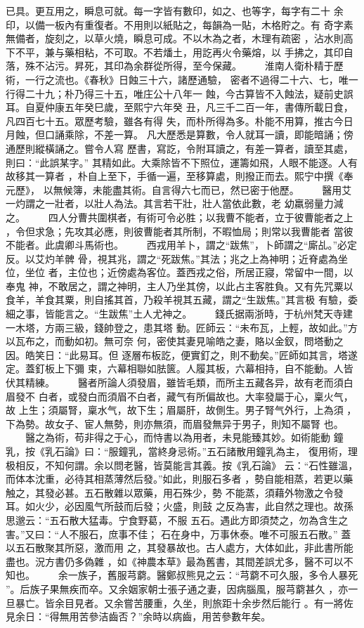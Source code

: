 \documentclass{ctexart}
\begin{document}
已具。更互用之，瞬息可就。每一字皆有數印，如之、也等字，每字有二十 余印，以備一板內有重復者。不用則以紙貼之，每韻為一貼，木格貯之。有 奇字素無備者，旋刻之，以草火燒，瞬息可成。不以木為之者，木理有疏密 ，沾水則高下不平，兼与藥相粘，不可取。不若燔土，用訖再火令藥熔，以 手拂之，其印自落，殊不沾污。昇死，其印為余群從所得，至今保藏。 　　淮南人衛朴精于歷術，一行之流也。《春秋》日蝕三十六，諸歷通驗， 密者不過得二十六、七，唯一行得二十九；朴乃得三十五，唯庄公十八年一 蝕，今古算皆不入蝕法，疑前史誤耳。自夏仲康五年癸巳歲，至熙宁六年癸 丑，凡三千二百一年，書傳所載日食，凡四百七十五。眾歷考驗，雖各有得 失，而朴所得為多。朴能不用算，推古今日月蝕，但口誦乘除，不差一算。 凡大歷悉是算數，令人就耳一讀，即能暗誦；傍通歷則縱橫誦之。嘗令人寫 歷書，寫訖，令附耳讀之，有差一算者，讀至其處，則曰：``此誤某字。'' 其精如此。大乘除皆不下照位，運籌如飛，人眼不能逐。人有故移其一算者 ，朴自上至下，手循一遍，至移算處，則撥正而去。熙宁中撰《奉元歷》， 以無候簿，未能盡其術。自言得六七而已，然已密于他歷。 　　醫用艾一灼謂之一壯者，以壯人為法。其言若干壯，壯人當依此數，老 幼羸弱量力減之。 　　四人分曹共圍棋者，有術可令必胜；以我曹不能者，立于彼曹能者之上 ，令但求急；先攻其必應，則彼曹能者其所制，不暇恤局；則常以我曹能者 當彼不能者。此虞卿斗馬術也。 　　西戎用羊卜，謂之``跋焦''，卜師謂之``廝乩。''必定反。以艾灼羊髀 骨，視其兆，謂之``死跋焦。''其法；兆之上為神明；近脊處為坐位，坐位 者，主位也；近傍處為客位。蓋西戎之俗，所居正寢，常留中一間，以奉鬼 神，不敢居之，謂之神明，主人乃坐其傍，以此占主客胜負。又有先咒粟以 食羊，羊食其粟，則自搖其首，乃殺羊視其五藏，謂之``生跋焦。''其言极 有驗，委細之事，皆能言之。``生跋焦''土人尤神之。 　　錢氏据兩浙時，于杭州梵天寺建一木塔，方兩三級，錢帥登之，患其塔 動。匠師云：``未布瓦，上輕，故如此。''方以瓦布之，而動如初。無可奈 何，密使其妻見喻皓之妻，賂以金釵，問塔動之因。皓笑日：``此易耳。但 逐層布板訖，便實釘之，則不動矣。''匠師如其言，塔遂定。蓋釘板上下彌 束，六幕相聯如胠篋。人履其板，六幕相持，自不能動。人皆伏其精練。 　　醫者所論人須發眉，雖皆毛類，而所主五藏各异，故有老而須白眉發不 白者，或發白而須眉不白者，藏气有所偏故也。大率發屬于心，稟火气，故 上生；須屬腎，稟水气，故下生；眉屬肝，故側生。男子腎气外行，上為須 ，下為勢。故女子、宦人無勢，則亦無須，而眉發無异于男子，則知不屬腎 也。 　　醫之為術，苟非得之于心，而恃書以為用者，未見能臻其妙。如術能動 鐘乳，按《乳石論》曰：``服鐘乳，當終身忌術。''五石諸散用鐘乳為主， 復用術，理极相反，不知何謂。余以問老醫，皆莫能言其義。按《乳石論》 云：``石性雖溫，而体本沈重，必待其相蒸薄然后發。''如此，則服石多者 ，勢自能相蒸，若更以藥触之，其發必甚。五石散雜以眾藥，用石殊少，勢 不能蒸，須藉外物激之令發耳。如火少，必因風气所鼓而后發；火盛，則鼓 之反為害，此自然之理也。故孫思邈云：``五石散大猛毒。宁食野葛，不服 五石。遇此方即須焚之，勿為含生之害。''又曰：``人不服石，庶事不佳； 石在身中，万事休泰。唯不可服五石散。'' 蓋以五石散聚其所惡，激而用 之，其發暴故也。古人處方，大体如此，非此書所能盡也。況方書仍多偽雜 ，如《神農本草》最為舊書，其間差誤尤多，醫不可以不知也。 　　余一族子，舊服芎藭。醫鄭叔熊見之云：``芎藭不可久服，多令人暴死 ''。后族子果無疾而卒。又余姻家朝士張子通之妻，因病腦風，服芎藭甚久 ，亦一旦暴亡。皆余目見者。又余嘗苦腰重，久坐，則旅距十余步然后能行 。有一將佐見余日：``得無用苦參洁齒否？''余時以病齒，用苦參數年矣。 
\end{document}
